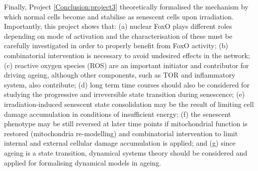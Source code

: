 Finally, Project \ref{Conclusion:project3} theoretically formalised the mechanism by which normal cells become and stabilise as senescent cells upon irradiation. Importantly, this project shows that: (a) nuclear FoxO plays different roles depending on mode of activation and the characterisation of these must be carefully investigated in order to properly benefit from FoxO activity; (b) combinatorial intervention is necessary to avoid undesired effects in the network; (c) reactive oxygen species (ROS) are an important initiator and contributor for driving ageing, although other components, such as TOR and inflammatory system, also contribute; (d) long term time courses should also be considered for studying the progressive and irreversible state transition during senescence; (e) irradiation-induced senescent state consolidation may be the result of limiting cell damage accumulation in conditions of insufficient energy; (f) the senescent phenotype may be still reversed at later time points if mitochondrial 
function is restored 
(mitochondria re-modelling) and combinatorial intervention to limit internal and external cellular damage accumulation is applied; and (g) since ageing is a state transition, dynamical systems theory should be considered and applied for formalising dynamical models in ageing.\\






